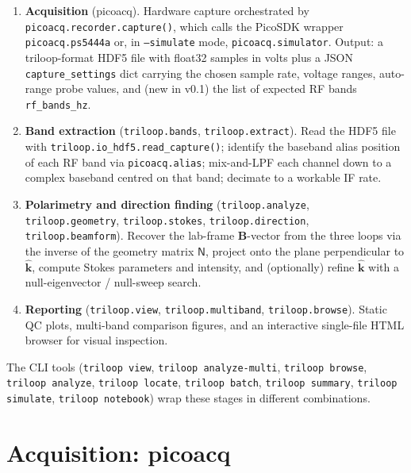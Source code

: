 \documentclass[11pt]{article}
\begin{document}
\begin{enumerate}\itemsep=2pt
\item \textbf{Acquisition} (\textsf{picoacq}).  Hardware capture
      orchestrated by \texttt{picoacq.recorder.capture()}, which calls
      the PicoSDK wrapper \texttt{picoacq.ps5444a} or, in
      \texttt{--simulate} mode, \texttt{picoacq.simulator}.  Output:
      a triloop-format HDF5 file with float32 samples in volts plus a
      JSON \texttt{capture\_settings} dict carrying the chosen sample
      rate, voltage ranges, auto-range probe values, and (new in v0.1)
      the list of expected RF bands \texttt{rf\_bands\_hz}.
\item \textbf{Band extraction} (\texttt{triloop.bands},
      \texttt{triloop.extract}).  Read the HDF5 file with
      \texttt{triloop.io\_hdf5.read\_capture()}; identify the baseband
      alias position of each RF band via \texttt{picoacq.alias};
      mix-and-LPF each channel down to a complex baseband centred on
      that band; decimate to a workable IF rate.
\item \textbf{Polarimetry and direction finding}
      (\texttt{triloop.analyze}, \texttt{triloop.geometry},
      \texttt{triloop.stokes}, \texttt{triloop.direction},
      \texttt{triloop.beamform}).  Recover the lab-frame
      $\mathbf B$-vector from the three loops via the inverse of the
      geometry matrix $\mathsf{N}$, project onto the plane
      perpendicular to $\hat{\mathbf k}$, compute Stokes parameters
      and intensity, and (optionally) refine $\hat{\mathbf k}$ with
      a null-eigenvector / null-sweep search.
\item \textbf{Reporting} (\texttt{triloop.view},
      \texttt{triloop.multiband}, \texttt{triloop.browse}).  Static
      QC plots, multi-band comparison figures, and an interactive
      single-file HTML browser for visual inspection.
\end{enumerate}

The CLI tools (\texttt{triloop view}, \texttt{triloop analyze-multi},
\texttt{triloop browse}, \texttt{triloop analyze},
\texttt{triloop locate}, \texttt{triloop batch}, \texttt{triloop
summary}, \texttt{triloop simulate}, \texttt{triloop notebook}) wrap
these stages in different combinations.

\section{Acquisition: \textsf{picoacq}}
\end{document}
